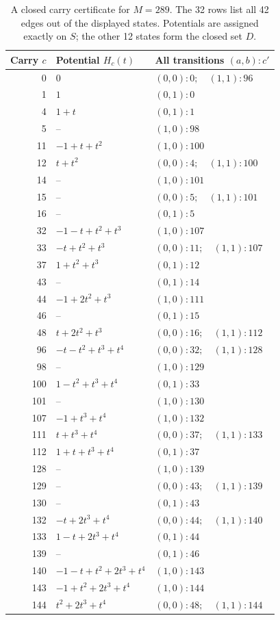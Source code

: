 \begin{table}[tbp]
\centering
\small
\setlength{\tabcolsep}{7pt}
\begin{tabular}{rll}
\toprule
Carry $c$ & Potential $H_c(t)$ & All transitions $(a,b):c'$\\
\midrule
0 & $0$ & $(0,0):0;\quad (1,1):96$ \\
1 & $1$ & $(0,1):0$ \\
4 & $1+t$ & $(0,1):1$ \\
5 & $\text{--}$ & $(1,0):98$ \\
11 & $-1+t+t^{2}$ & $(1,0):100$ \\
12 & $t+t^{2}$ & $(0,0):4;\quad (1,1):100$ \\
14 & $\text{--}$ & $(1,0):101$ \\
15 & $\text{--}$ & $(0,0):5;\quad (1,1):101$ \\
16 & $\text{--}$ & $(0,1):5$ \\
32 & $-1-t+t^{2}+t^{3}$ & $(1,0):107$ \\
33 & $-t+t^{2}+t^{3}$ & $(0,0):11;\quad (1,1):107$ \\
37 & $1+t^{2}+t^{3}$ & $(0,1):12$ \\
43 & $\text{--}$ & $(0,1):14$ \\
44 & $-1+2t^{2}+t^{3}$ & $(1,0):111$ \\
46 & $\text{--}$ & $(0,1):15$ \\
48 & $t+2t^{2}+t^{3}$ & $(0,0):16;\quad (1,1):112$ \\
96 & $-t-t^{2}+t^{3}+t^{4}$ & $(0,0):32;\quad (1,1):128$ \\
98 & $\text{--}$ & $(1,0):129$ \\
100 & $1-t^{2}+t^{3}+t^{4}$ & $(0,1):33$ \\
101 & $\text{--}$ & $(1,0):130$ \\
107 & $-1+t^{3}+t^{4}$ & $(1,0):132$ \\
111 & $t+t^{3}+t^{4}$ & $(0,0):37;\quad (1,1):133$ \\
112 & $1+t+t^{3}+t^{4}$ & $(0,1):37$ \\
128 & $\text{--}$ & $(1,0):139$ \\
129 & $\text{--}$ & $(0,0):43;\quad (1,1):139$ \\
130 & $\text{--}$ & $(0,1):43$ \\
132 & $-t+2t^{3}+t^{4}$ & $(0,0):44;\quad (1,1):140$ \\
133 & $1-t+2t^{3}+t^{4}$ & $(0,1):44$ \\
139 & $\text{--}$ & $(0,1):46$ \\
140 & $-1-t+t^{2}+2t^{3}+t^{4}$ & $(1,0):143$ \\
143 & $-1+t^{2}+2t^{3}+t^{4}$ & $(1,0):144$ \\
144 & $t^{2}+2t^{3}+t^{4}$ & $(0,0):48;\quad (1,1):144$ \\
\bottomrule
\end{tabular}
\caption{A closed carry certificate for $M=289$. The 32 rows list
all 42 edges out of the displayed states. Potentials are assigned
exactly on $S$; the other 12 states form the closed set $D$.}
\label{numerator:tab:certificate}
\end{table}

